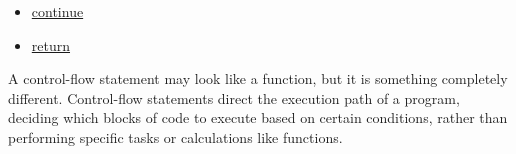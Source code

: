 \documentclass{dcbl/challenge}
\begin{document}
\begin{itemize}
    \item \href{https://godbolt.org/#g:!((g:!((g:!((h:codeEditor,i:(filename:'1',fontScale:14,fontUsePx:'0',j:1,lang:___c,selection:(endColumn:2,endLineNumber:13,positionColumn:2,positionLineNumber:13,selectionStartColumn:2,selectionStartLineNumber:13,startColumn:2,startLineNumber:13),source:'%23include+%3Cstdio.h%3E%0A%0Aint+main()+%7B%0A++int+i,+j%3B%0A++for+(i+%3D+1%3B+i+%3C+3%3B+i%2B%2B)+%7B%0A++++for+(j+%3D+1%3B+j+%3C+5%3B+j%2B%2B)+%7B%0A++++++if+(j+%3D%3D+2)%0A++++++++continue%3B%0A++++++printf(%22%25d%5Cn%22,+j)%3B%0A++++%7D%0A++%7D%0A++return+0%3B%0A%7D'),l:'5',n:'0',o:'C+source+%231',t:'0')),k:55.65441596385128,l:'4',m:100,n:'0',o:'',s:0,t:'0'),(g:!((h:executor,i:(argsPanelShown:'1',compilationPanelShown:'0',compiler:cg121,compilerName:'',compilerOutShown:'0',execArgs:'',execStdin:'',fontScale:14,fontUsePx:'0',j:1,lang:___c,libs:!(),options:'',overrides:!(),runtimeTools:!(),source:1,stdinPanelShown:'1',tree:'1',wrap:'1'),l:'5',n:'0',o:'Executor+x86-64+gcc+12.1+(C,+Editor+%231)',t:'0')),k:44.34558403614872,l:'4',n:'0',o:'',s:0,t:'0')),l:'2',n:'0',o:'',t:'0')),version:4}{continue}
    \item \href{https://godbolt.org/#g:!((g:!((g:!((h:codeEditor,i:(filename:'1',fontScale:14,fontUsePx:'0',j:1,lang:___c,selection:(endColumn:2,endLineNumber:13,positionColumn:2,positionLineNumber:13,selectionStartColumn:2,selectionStartLineNumber:13,startColumn:2,startLineNumber:13),source:'%23include+%3Cstdio.h%3E%0A%0Achar+func()+%7B%0A++printf(%22The+Control-Flow+is+here+%5Cn%22)%3B%0A++return+1%3B%0A++%0A%7D%0Aint+main()+%7B%0A++printf(%22Control-Flow+starts+here+%5Cn%22)%3B%0A++func()%3B%0A++printf(%22Control-Flow+is+back+in+main%22)%3B%0A++return+0%3B%0A%7D'),l:'5',n:'0',o:'C+source+%231',t:'0')),k:55.65441596385128,l:'4',m:100,n:'0',o:'',s:0,t:'0'),(g:!((h:executor,i:(argsPanelShown:'1',compilationPanelShown:'0',compiler:cg121,compilerName:'',compilerOutShown:'0',execArgs:'',execStdin:'',fontScale:14,fontUsePx:'0',j:1,lang:___c,libs:!(),options:'',overrides:!(),runtimeTools:!(),source:1,stdinPanelShown:'1',tree:'1',wrap:'1'),l:'5',n:'0',o:'Executor+x86-64+gcc+12.1+(C,+Editor+%231)',t:'0')),k:44.34558403614872,l:'4',n:'0',o:'',s:0,t:'0')),l:'2',n:'0',o:'',t:'0')),version:4}{return}
\end{itemize}
A control-flow statement may look like a function, but it is something completely different. Control-flow statements direct the execution path of a program, deciding which blocks of code to execute based on certain conditions, rather than performing specific tasks or calculations like functions.
    
\end{document}
